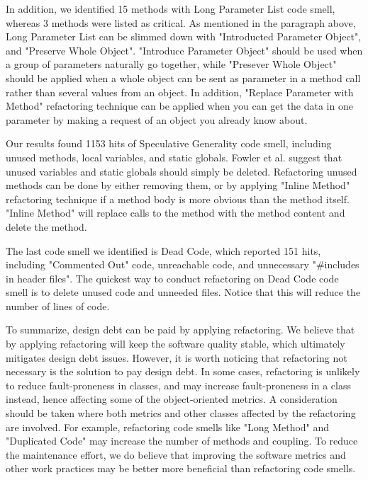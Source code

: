 In addition, we identified 15 methods with Long Parameter List code smell, whereas 3 methods were listed as critical. As mentioned in the paragraph above, Long Parameter List can be slimmed down with "Introducted Parameter Object", and "Preserve Whole Object". "Introduce Parameter Object" should be used when a group of parameters naturally go together, while "Presever Whole Object" should be applied when a whole object can be sent as parameter in a method call rather than several values from an object. In addition, "Replace Parameter with Method" refactoring technique can be applied when you can get the data in one parameter by making a request of an object you already know about\cite{fowler1999refactoring}.

Our results found 1153 hits of Speculative Generality code smell, including unused methods, local variables, and static globals. Fowler et al.\cite{fowler1999refactoring} suggest that unused variables and static globals should simply be deleted. Refactoring unused methods can be done by either removing them, or by applying "Inline Method" refactoring technique if a method body is more obvious than the method itself. "Inline Method" will replace calls to the method with the method content and delete the method.

The last code smell we identified is Dead Code, which reported 151 hits, including "Commented Out" code, unreachable code, and unnecessary "\#includes in header files". The quickest way to conduct refactoring on Dead Code code smell is to delete unused code and unneeded files. Notice that this will reduce the number of lines of code.

To summarize, design debt can be paid by applying refactoring. We believe that by applying refactoring will keep the software quality stable, which ultimately mitigates design debt issues. However, it is worth noticing that refactoring not necessary is the solution to pay design debt. In some cases, refactoring is unlikely to reduce fault-proneness in classes, and may increase fault-proneness in a class instead\cite{hall2014some}, hence affecting some of the object-oriented metrics. A consideration should be taken where both metrics and other classes affected by the refactoring are involved. For example, refactoring code smells like "Long Method" and "Duplicated Code" may increase the number of methods and coupling. To reduce the maintenance effort, we do believe that improving the software metrics and other work practices may be better more beneficial than refactoring code smells. 


